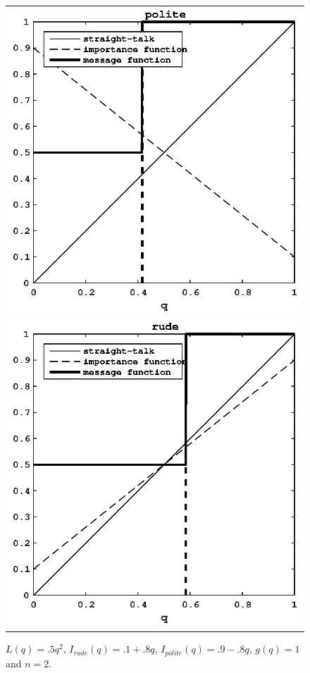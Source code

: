 \documentclass[12pt]{article}
\begin{document}
\begin{figure}[H]
\centering
\begin{tabular}{c}
\includegraphics{polite2} \\
\includegraphics{rude2}
\end{tabular}
\caption{$L(q)=.5q^2$, $I_{rude}(q)=.1+.8q$, $I_{polite}(q)=.9-.8q$, $g(q)=1$ and $n=2$.}
\end{figure}
\end{document}
